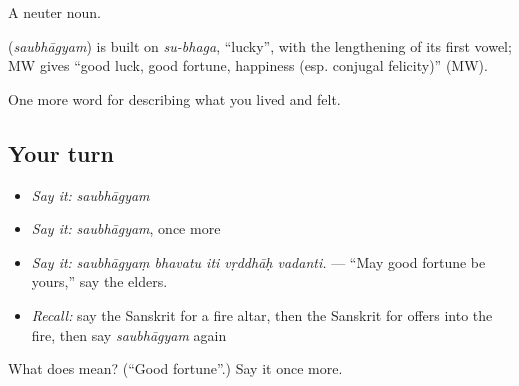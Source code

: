 A neuter noun.

\begin{cousinweb}
\textbf{} (\emph{saubhāgyam}) is built on \emph{su-bhaga}, \textquotedblleft{}lucky\textquotedblright{}, with the lengthening of its first vowel; MW gives \textquotedblleft{}good luck, good fortune, happiness (esp. conjugal felicity)\textquotedblright{} (MW).
\end{cousinweb}

\begin{grammarlens}[title={What you've built}]
One more word for describing what you lived and felt.
\end{grammarlens}

\subsection*{Your turn}
\begin{itemize}
\raggedright
  \item \emph{Say it:} \emph{saubhāgyam}
  \item \emph{Say it:} \emph{saubhāgyam}, once more
  \item \emph{Say it:} \emph{saubhāgyaṃ bhavatu iti vṛddhāḥ vadanti.} — \textquotedblleft{}May good fortune be yours,\textquotedblright{} say the elders.
  \item \emph{Recall:} say the Sanskrit for a fire altar, then the Sanskrit for offers into the fire, then say \emph{saubhāgyam} again
\end{itemize}

\begin{tcolorbox}[breakable,colback=teal!4,colframe=teal!35!black,title={Before you move on}]
What does  mean? (\textquotedblleft{}Good fortune\textquotedblright{}.) Say it once more.
\end{tcolorbox}
